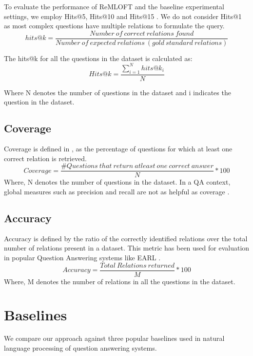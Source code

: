 To evaluate the performance of ReMLOFT and the baseline experimental settings, we employ Hits@5, Hits@10 and Hits@15 . We do not consider Hits@1 as most complex questions have multiple relations to formulate the query.
\begin{equation}
hits@k=\frac{Number \ of \ correct \ relations \ found}{Number \ of \ expected \ relations \ (gold \ standard \ relations)}
\end{equation}

The hits@k for all the questions in the dataset is calculated as:
\begin{equation}
    Hits@k=\frac{\sum_{i=1}^N hits@k_i}{N}
\end{equation}

Where N denotes the number of questions in the dataset and i indicates the question in the dataset.

\subsection{Coverage}
Coverage is defined in \cite{robertsetal}, as the percentage of questions for which at least one correct relation is retrieved. 
\begin{equation}
    Coverage=\frac{\#Questions \ that \ return \ at least \ one \ correct \ answer}{N} * 100
\end{equation}
Where, N denotes the number of questions in the dataset.
 In a QA context, global measures such as precision and recall are not as helpful as coverage \cite{robertsetal}.

\subsection{Accuracy}
Accuracy is defined by the ratio of the correctly identified relations over the total number of relations present in a dataset. This metric has been used for evaluation in popular Question Answering systems like EARL \cite{earl}.
\begin{equation}
    Accuracy=\frac{ Total \ Relations \ returned}{M} * 100
\end{equation}
Where, M denotes the number of relations in all the questions in the dataset.

\section{Baselines}
\label{sec:baselines}
We compare our approach against three popular baselines used in natural language processing of question answering systems.

